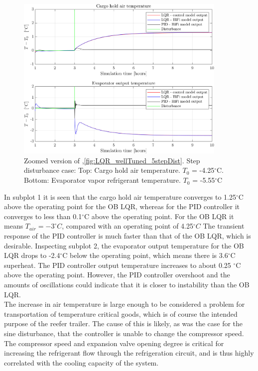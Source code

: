 \begin{figure}[H]
	\centering
	\includegraphics[width=0.9\textwidth]{Graphics/fig_LQRvsKresten_stepDist_zoom.png}
	\caption{Zoomed version of ,\cref{fig:LQR_wellTuned_5stepDist}. Step disturbance case: Top: Cargo hold air temperature. $T_0$ = -4.25$^{\circ}$C. Bottom: Evaporator vapor refrigerant temperature. $T_0$ = -5.55$^{\circ}$C}
	\label{fig:LQR_wellTuned_5stepDist_zoom}
\end{figure}

\noindent In subplot 1 it is seen that the cargo hold air temperature converges to 1.25$^{\circ}$C above the operating point for the OB LQR, whereas for the PID controller it converges to less than 0.1$^{\circ}$C above the operating point.
For the OB LQR it means $T_{air} = -3^{\circ}C$, compared with an operating point of 4.25$^{\circ}C$
The transient response of the PID controller is much faster than that of the OB LQR, which is desirable. 
Inspecting subplot 2, the evaporator output temperature for the OB LQR drops to -2.4$^{\circ}$C below the operating point, which means there is 3.6$^{\circ}$C superheat. The PID controller output temperature increases to about 0.25 $^{\circ}$C above the operating point.
However, the PID controller overshoot and the amounts of oscillations could indicate that it is closer to instability than the OB LQR.\\

The increase in air temperature is large enough to be considered a problem for transportation of temperature critical goods, which is of course the intended purpose of the reefer trailer. The cause of this is likely, as was the case for the sine disturbance, that the controller is unable to change the compressor speed. The compressor speed and expansion valve opening degree is critical for increasing the refrigerant flow through the refrigeration circuit, and is thus highly correlated with the cooling capacity of the system. \\

